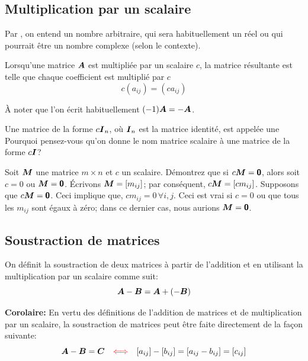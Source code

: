 \subsection{Multiplication par un scalaire}

Par , on entend un nombre arbitraire, qui sera
habituellement un réel ou qui pourrait être un nombre complexe (selon
le contexte).   
\begin{defini}
Lorsqu'une matrice $\boldsymbol{A}$ est multipliée par un scalaire $c$,
la matrice résultante est telle que chaque coefficient est multiplié par $c$
\[
c(a_{ij}) = (ca_{ij})
\]
\end{defini}

À noter que l'on écrit habituellement $(-1) \boldsymbol{A} = -\boldsymbol{A}$.

Une matrice de la forme $c\boldsymbol{I}_n$, où $\boldsymbol{I}_n$ est la matrice identité, est appelée
une  {\tiny Pourquoi pensez-vous qu'on donne le nom matrice scalaire à une matrice de la forme $c\boldsymbol{I}$?}
\begin{exemple}
	Soit $\boldsymbol{M}$ une matrice $m\times n$ et $c$ un scalaire.  Démontrez que si $c\boldsymbol{M} = \mbox{\textsf{\textbf{{0}}}}$, alors
	soit $c=0$ ou $\boldsymbol{M}=\mbox{\textsf{\textbf{{0}}}}$.
	\solution
	Écrivons $\boldsymbol{M}=[m_{ij}]$; par conséquent, $c\boldsymbol{M} = [cm_{ij}]$.  Supposons que $c\boldsymbol{M} = \mbox{\textsf{\textbf{{0}}}}$.  Ceci implique que,
	$ cm_{ij}=0\,\forall i, j $.  Ceci est vrai si $c=0$ ou que tous les $m_{ij}$ sont égaux à zéro; dans ce dernier
	cas, nous aurions $\boldsymbol{M}=\mbox{\textsf{\textbf{{0}}}}$.
\end{exemple}

\subsection{Soustraction de matrices}

\begin{defini}
On définit la soustraction de deux matrices
à partir de l'addition et en utilisant la multiplication par un scalaire comme suit:
\[
\boldsymbol{A}-\boldsymbol{B} = \boldsymbol{A} + (-\boldsymbol{B})
\]
\end{defini}

\textbf{Corolaire:} En vertu des définitions de l'addition de matrices et de multiplication par un scalaire, la
soustraction de matrices peut être faite directement de la façon suivante:
\[
\boldsymbol{A} - \boldsymbol{B} = \boldsymbol{C} \quad {\color{red}\Longleftrightarrow} \quad [a_{ij}] - [b_{ij}] = [a_{ij} - b_{ij}] = [c_{ij}]
\]

